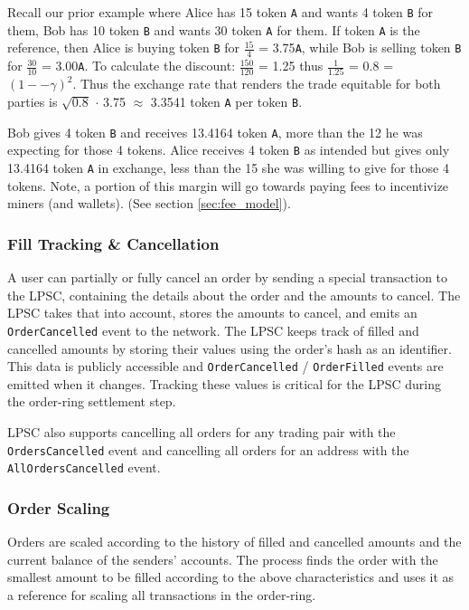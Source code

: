 \documentclass[UTF8,nofonts]{article}
\begin{document}
\begin{multicols}{2}
Recall our prior example where Alice has 15 token \verb|A| and wants 4 token \verb|B| for them, Bob has 10 token \verb|B| and wants 30 token \verb|A| for them. If token \verb|A| is the reference, then Alice is buying token \verb|B| for $\frac{15}{4}$ = 3.75\verb|A|, while Bob is selling token \verb|B| for $\frac{30}{10}$ = 3.00\verb|A|. To calculate the discount: $\frac{150}{120}$ = 1.25 thus $\frac{1}{1.25}$ = 0.8 = $(1 −- \gamma)^2$. Thus the exchange rate that renders the trade equitable for both parties is $\sqrt{0.8}$ $\cdot$ 3.75 $\approx$ 3.3541 token \verb|A| per token \verb|B|.

Bob gives 4 token \verb|B| and receives 13.4164 token \verb|A|, more than the 12 he was expecting for those 4 tokens. Alice receives 4 token \verb|B| as intended but gives only 13.4164 token \verb|A| in exchange, less than the 15 she was willing to give for those 4 tokens.
Note, a portion of this margin will go towards paying fees to incentivize miners (and wallets). (See section \ref{sec:fee_model}).


\subsubsection{Fill Tracking \& Cancellation}

A user can partially or fully cancel an order by sending a special transaction to the LPSC, containing the details about the order and the amounts to cancel. The LPSC takes that into account, stores the amounts to cancel, and emits an \verb|OrderCancelled| event to the network. The LPSC keeps track of filled and cancelled amounts by storing their values using the order's hash as an identifier. This data is publicly accessible and \verb|OrderCancelled| / \verb|OrderFilled| events are emitted when it changes. Tracking these values is critical for the LPSC during the order-ring settlement step.

LPSC also supports cancelling all orders for any trading pair with the \verb|OrdersCancelled| event  and cancelling all orders for an address with the \verb|AllOrdersCancelled| event.


\subsubsection{Order Scaling\label{sec:order_scaling}}
Orders are scaled according to the history of filled and cancelled amounts and the current balance of the senders' accounts. The process finds the order with the smallest amount to be filled according to the above characteristics and uses it as a reference for scaling all transactions in the order-ring.



\end{multicols}
\end{document}
